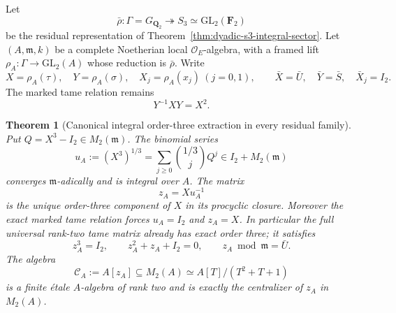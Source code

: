 \documentclass[11pt]{article}
\newtheorem{theorem}{Theorem}[section]
\theoremstyle{definition}
\begin{document}
Let
\[
\bar\rho:\Gamma=G_{\mathbf Q_2}
\twoheadrightarrow S_3
\simeq\mathrm{GL}_2(\mathbf F_2)
\]
be the residual representation of
Theorem~\ref{thm:dyadic-s3-integral-sector}.
Let $(A,\mathfrak m,k)$ be a complete
Noetherian local $\mathcal O_E$-algebra,
with a framed lift
$\rho_A:\Gamma\to\mathrm{GL}_2(A)$
whose reduction is $\bar\rho$.
Write
\[
X=\rho_A(\tau),\quad
Y=\rho_A(\sigma),\quad
X_j=\rho_A(x_j)\ (j=0,1),
\qquad
\bar X=\bar U,\quad
\bar Y=\bar S,\quad
\bar X_j=I_2.
\]
The marked tame relation remains
\begin{equation}\label{eq:dyadic-f131-tame-relation}
Y^{-1}XY=X^2.
\end{equation}

\begin{theorem}[Canonical integral order-three extraction in every residual family]
\label{thm:dyadic-f131-canonical-tame-extraction}
Put $Q=X^3-I_2\in M_2(\mathfrak m)$.
The binomial series
\begin{equation}\label{eq:dyadic-f131-tame-root}
u_A:=(X^3)^{1/3}
=\sum_{j\ge0}\binom{1/3}{j}Q^j
\in I_2+M_2(\mathfrak m)
\end{equation}
converges $\mathfrak m$-adically
and is integral over $A$.
The matrix
\begin{equation}\label{eq:dyadic-f131-odd-tame-matrix}
\boxed{\qquad
z_A=Xu_A^{-1}
\qquad}
\end{equation}
is the unique order-three
component of $X$ in its
procyclic closure.  Moreover the
\emph{exact marked tame relation}
forces $u_A=I_2$ and $z_A=X$.
In particular the full universal
rank-two tame matrix already
has exact order three; it satisfies
\begin{equation}\label{eq:dyadic-f131-cubic-etale}
\boxed{\qquad
z_A^3=I_2,\qquad
z_A^2+z_A+I_2=0,\qquad
z_A\bmod\mathfrak m=\bar U.
\qquad}
\end{equation}
The algebra
\begin{equation}\label{eq:dyadic-f131-canonical-tame-etale-algebra}
\mathcal C_A:=A[z_A]\subseteq M_2(A)
\simeq A[T]/(T^2+T+1)
\end{equation}
is a finite étale $A$-algebra
of rank two and is exactly the
centralizer of $z_A$ in $M_2(A)$.


\end{theorem}
\end{document}
